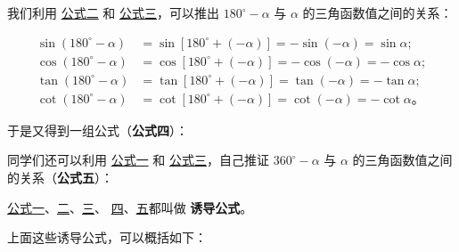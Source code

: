 \vspace{2em}
我们利用 \hyperref[gongshi:2]{公式二} 和 \hyperref[gongshi:3]{公式三}，可以推出 $180^\circ - \alpha$ 与 $\alpha$ 的三角函数值之间的关系：

\vspace{-1em}\begin{align*}
    \sin(180^\circ - \alpha) &= \sin[180^\circ + (-\alpha)] = -\sin(-\alpha) = \sin\alpha ; \\
    \cos(180^\circ - \alpha) &= \cos[180^\circ + (-\alpha)] = -\cos(-\alpha) = -\cos\alpha ; \\
    \tan(180^\circ - \alpha) &= \tan[180^\circ + (-\alpha)] = \tan(-\alpha) = -\tan\alpha ; \\
    \cot(180^\circ - \alpha) &= \cot[180^\circ + (-\alpha)] = \cot(-\alpha) = -\cot\alpha \text{。}
\end{align*}

于是又得到一组公式（\textbf{公式四}）：

\begin{center}
\end{center}

同学们还可以利用 \hyperref[gongshi:1]{公式一} 和 \hyperref[gongshi:3]{公式三}，自己推证 $360^\circ - \alpha$
与 $\alpha$ 的三角函数值之间的关系（\textbf{公式五}）：

\begin{center}
\end{center}

\hyperref[gongshi:1]{公式一}、\hyperref[gongshi:2]{二}、\hyperref[gongshi:3]{三}、
\hyperref[gongshi:4]{四}、\hyperref[gongshi:5]{五}都叫做 \textbf{诱导公式}。

上面这些诱导公式，可以概括如下：


